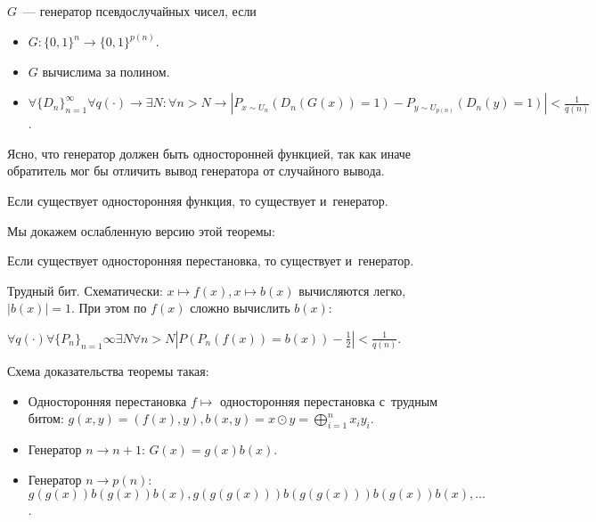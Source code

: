 \documentclass{article}
\begin{document}
\begin{definition}
	$G$~--- генератор псевдослучайных чисел, если
	\begin{itemize}
		\item $G: \{0, 1\}^n \rightarrow \{0, 1\}^{p(n)}$.
		\item $G$ вычислима за полином.
		\item $\forall \{D_n\}_{n=1}^{\infty} \forall q(\cdot) \rightarrow
			\exists N: \forall n > N \rightarrow \left| P_{x \sim U_n}(D_n(G(x)) = 1)
			- P_{y \sim U_{p(n)}}(D_n(y) = 1) \right| < \frac{1}{q(n)}$.
	\end{itemize}
\end{definition}

Ясно, что генератор должен быть односторонней функцией, так как иначе обратитель
мог бы отличить вывод генератора от случайного вывода.

\begin{theorem}
	Если существует односторонняя функция, то существует и~генератор.
\end{theorem}

Мы докажем ослабленную версию этой теоремы:

\begin{theorem}
	Если существует односторонняя перестановка, то существует и~генератор.
\end{theorem}

\begin{definition}
	Трудный бит. Схематически: $x \mapsto f(x), x \mapsto b(x)$ вычисляются
	легко, $|b(x)| = 1$. При этом по $f(x)$ сложно вычислить $b(x)$:

	$\forall q(\cdot) \forall\{ P_n \}_{n=1}{\infty} \exists N \forall n > N
	|P(P_n(f(x)) = b(x)) - \frac{1}{2}| < \frac{1}{q(n)}$.
\end{definition}

Схема доказательства теоремы такая:
\begin{itemize}
	\item Односторонняя перестановка $f \mapsto$ односторонняя перестановка
		с~трудным битом: $g(x, y) = (f(x), y), b(x, y) = x \odot y =
		\bigoplus\limits_{i=1}^n x_i y_i$.
	\item Генератор $n \rightarrow n + 1$: $G(x) = g(x) b(x)$.
	\item Генератор $n \rightarrow p(n)$: $g(g(x))b(g(x))b(x),
		g(g(g(x)))b(g(g(x)))b(g(x))b(x), \ldots$.
\end{itemize}
\end{document}
